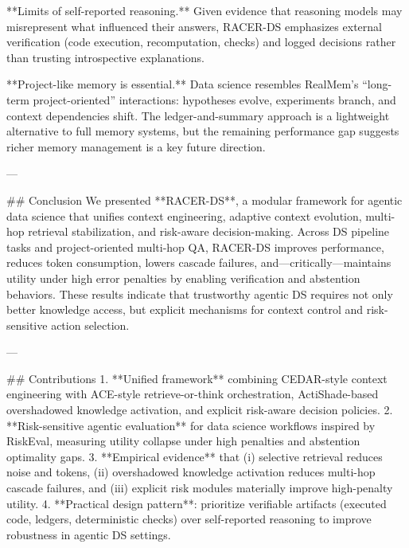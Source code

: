 **Limits of self-reported reasoning.** Given evidence that reasoning models may misrepresent what influenced their answers, RACER-DS emphasizes external verification (code execution, recomputation, checks) and logged decisions rather than trusting introspective explanations.

**Project-like memory is essential.** Data science resembles RealMem’s “long-term project-oriented” interactions: hypotheses evolve, experiments branch, and context dependencies shift. The ledger-and-summary approach is a lightweight alternative to full memory systems, but the remaining performance gap suggests richer memory management is a key future direction.

---

## Conclusion  
We presented **RACER-DS**, a modular framework for agentic data science that unifies context engineering, adaptive context evolution, multi-hop retrieval stabilization, and risk-aware decision-making. Across DS pipeline tasks and project-oriented multi-hop QA, RACER-DS improves performance, reduces token consumption, lowers cascade failures, and—critically—maintains utility under high error penalties by enabling verification and abstention behaviors. These results indicate that trustworthy agentic DS requires not only better knowledge access, but explicit mechanisms for context control and risk-sensitive action selection.

---

## Contributions  
1. **Unified framework** combining CEDAR-style context engineering with ACE-style retrieve-or-think orchestration, ActiShade-based overshadowed knowledge activation, and explicit risk-aware decision policies.  
2. **Risk-sensitive agentic evaluation** for data science workflows inspired by RiskEval, measuring utility collapse under high penalties and abstention optimality gaps.  
3. **Empirical evidence** that (i) selective retrieval reduces noise and tokens, (ii) overshadowed knowledge activation reduces multi-hop cascade failures, and (iii) explicit risk modules materially improve high-penalty utility.  
4. **Practical design pattern**: prioritize verifiable artifacts (executed code, ledgers, deterministic checks) over self-reported reasoning to improve robustness in agentic DS settings.